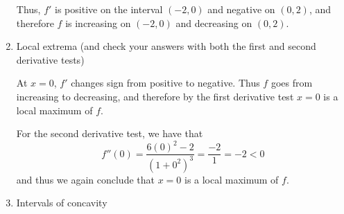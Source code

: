 \documentclass[handout,nooutcomes]{ximera}
\begin{document}
\begin{problem}
\begin{enumerate}
\begin{freeResponse}
		
\begin{center}
\begin{image}
\end{image}
\end{center}


		Thus, $f'$ is positive on the interval $(-2,0)$ and negative on $(0,2)$, and therefore $f$ is increasing on $(-2,0)$ and decreasing on $(0,2)$.  
		\end{freeResponse}
		
	\item  Local extrema (and check your answers with both the first and second derivative tests)
	
		\begin{freeResponse}
		At $x=0$, $f'$ changes sign from positive to negative.  Thus $f$ goes from increasing to decreasing, and therefore by the first derivative test $x=0$ is a local maximum of $f$.  
		
		For the second derivative test, we have that
		$$ f''(0) = \frac{6(0)^2 - 2}{(1+0^2)^3} = \frac{-2}{1} = -2 < 0 $$
		and thus we again conclude that $x=0$ is a local maximum of $f$.
		\end{freeResponse}
		
	\item  Intervals of concavity
	

\end{enumerate}
\end{problem}
\end{document}

